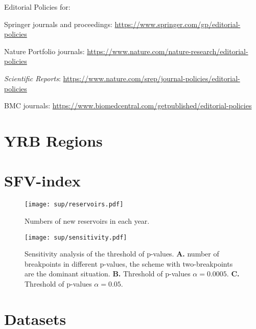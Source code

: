 \documentclass[default,iicol,lineno]{sn-jnl}%
\theoremstyle{thmstyleone}%
\theoremstyle{thmstyletwo}%
\theoremstyle{thmstylethree}%
\begin{document}
\bigskip
\begin{flushleft}%
Editorial Policies for:

\bigskip\noindent
Springer journals and proceedings: \url{https://www.springer.com/gp/editorial-policies}

\bigskip\noindent
Nature Portfolio journals: \url{https://www.nature.com/nature-research/editorial-policies}

\bigskip\noindent
\textit{Scientific Reports}: \url{https://www.nature.com/srep/journal-policies/editorial-policies}

\bigskip\noindent
BMC journals: \url{https://www.biomedcentral.com/getpublished/editorial-policies}
\end{flushleft}

\begin{appendices}

\section{YRB Regions}\label{secA1}


\section{SFV-index}\label{secA2}





\begin{figure}[tb]
	\centering
	\texttt{[image: sup/reservoirs.pdf]}
	\caption{
	    Numbers of new reservoirs in each year.
	}
	\label{fig:reservoirs}
\end{figure}

\begin{figure}
    \centering
    \texttt{[image: sup/sensitivity.pdf]}
    \caption{
        Sensitivity analysis of the threshold of p-values.
        \textbf{A.} number of breakpoints in different p-values, the scheme with two-breakpoints are the dominant situation.
        \textbf{B.} Threshold of p-values $\alpha=0.0005$.
        \textbf{C.} Threshold of p-values $\alpha=0.05$.
    }
    \label{fig:sensitivity}
\end{figure}


\section{Datasets}\label{secA3}


\end{appendices}
\end{document}
